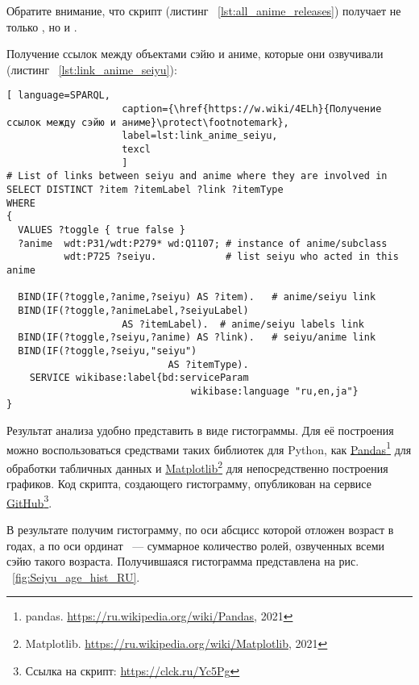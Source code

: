 Обратите внимание, что скрипт (листинг ~\protect\ref{lst:all_anime_releases}) получает не только  , но и . 

Получение ссылок между объектами сэйю и аниме, которые они озвучивали (листинг ~\protect\ref{lst:link_anime_seiyu}): 

\begin{lstlisting}[ language=SPARQL, 
                    caption={\href{https://w.wiki/4ELh}{Получение ссылок между сэйю и аниме}\protect\footnotemark},
                    label=lst:link_anime_seiyu,
                    texcl 
                    ]
# List of links between seiyu and anime where they are involved in
SELECT DISTINCT ?item ?itemLabel ?link ?itemType
WHERE
{
  VALUES ?toggle { true false }
  ?anime  wdt:P31/wdt:P279* wd:Q1107; # instance of anime/subclass
          wdt:P725 ?seiyu.            # list seiyu who acted in this anime
  
  BIND(IF(?toggle,?anime,?seiyu) AS ?item).   # anime/seiyu link
  BIND(IF(?toggle,?animeLabel,?seiyuLabel)
					AS ?itemLabel).  # anime/seiyu labels link
  BIND(IF(?toggle,?seiyu,?anime) AS ?link).   # seiyu/anime link
  BIND(IF(?toggle,?seiyu,"seiyu")
							AS ?itemType).
    SERVICE wikibase:label{bd:serviceParam
					     		wikibase:language "ru,en,ja"}
}
\end{lstlisting}%

Результат анализа удобно представить в виде гистограммы. Для её построения можно воспользоваться средствами таких библиотек для Python, как \href{https://ru.wikipedia.org/wiki/Pandas}{Pandas}\footnote{pandas. \href{https://ru.wikipedia.org/wiki/Pandas}{https://ru.wikipedia.org/wiki/Pandas}, 2021} для обработки табличных данных и \href{https://ru.wikipedia.org/wiki/Matplotlib}{Matplotlib}\footnote{Matplotlib. \href{https://ru.wikipedia.org/wiki/Matplotlib}{https://ru.wikipedia.org/wiki/Matplotlib}, 2021} для непосредственно построения графиков. Код скрипта, создающего гистограмму, опубликован на сервисе \href{https://github.com/componavt/wd_book/blob/master/programming_tasks/seiyu_age/age_act_hist.ipynb}{GitHub}\footnote{Ссылка на скрипт: \href{https://clck.ru/Yc5Pg}{https://clck.ru/Yc5Pg}}.

В результате получим гистограмму, по оси абсцисс которой отложен возраст в годах, а по оси ординат ~--- суммарное количество ролей, озвученных всеми сэйю такого возраста. Получившаяся гистограмма представлена на рис. ~\ref{fig:Seiyu_age_hist_RU}. 

